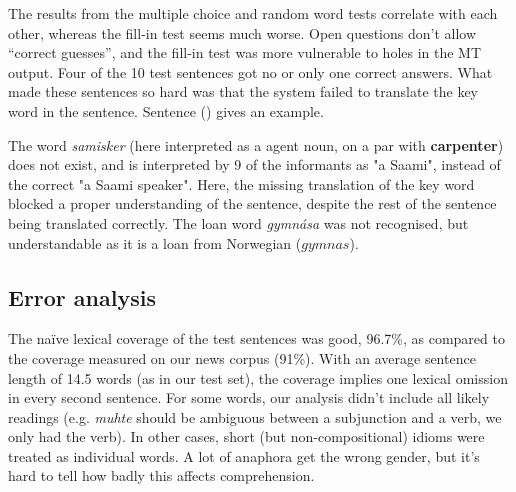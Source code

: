 The results from the multiple choice and random word tests correlate
with each other, whereas the fill-in test seems much worse. Open
questions don't allow ``correct guesses'', and the fill-in test was
more vulnerable to holes in the MT output. Four of the 10 test
sentences got no or only one correct answers. What made these
sentences so hard was that the system failed to translate the key word
in the sentence. Sentence () gives an example.



The word \textit{samisker} (here interpreted as a agent noun, on a par
with \textbf{carpenter}) does not exist, and is interpreted by 9 of
the informants as "a Saami", instead of the correct "a Saami speaker".
Here, the missing translation of the key word blocked a proper
understanding of the sentence, despite the rest of the sentence being
translated correctly. The loan word \textit{gymn\'{a}sa} was not
recognised, but understandable as it is a loan from Norwegian
($gymnas$).



\subsection{Error analysis}



The na\"{i}ve lexical coverage of the test sentences was good, 96.7\%, 
as compared to the coverage measured on our news corpus (91\%). With
an average sentence length of 14.5 words (as in our test set), the coverage
implies one lexical omission in every second sentence. For
some words, our analysis didn't include all likely readings (e.g.
\textit{muhte} should be ambiguous between a subjunction and a verb,
we only had the verb). In other cases, short (but non-compositional)
idioms were treated as individual words. A lot of anaphora get the
wrong gender, but it's hard to tell how badly this affects
comprehension.

